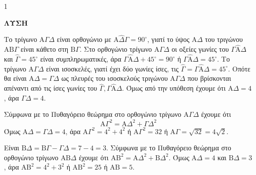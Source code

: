 \begin{ylh}{1}
    \item [Ύλη από εικόνα]
\end{ylh}
\textbf{ΛΥΣΗ}
\begin{alist}
    \item \begin{rlist}
        \item Το τρίγωνο $\text{A}\Gamma\Delta$ είναι ορθογώνιο με $\text{A}\hat{\Delta}\Gamma = 90^\circ$, γιατί το ύψος $\text{A}\Delta$ του τριγώνου $\text{AB}\Gamma$ είναι κάθετο στη $\text{B}\Gamma$. Στο ορθογώνιο τρίγωνο $\text{A}\Gamma\Delta$ οι οξείες γωνίες του $\Gamma\hat{\text{A}}\Delta$ και $\hat{\Gamma} = 45^\circ$ είναι συμπληρωματικές, άρα $\Gamma\hat{\text{A}}\Delta + 45^\circ = 90^\circ$ ή $\Gamma\hat{\text{A}}\Delta = 45^\circ$.
        Το τρίγωνο $\text{A}\Gamma\Delta$ είναι ισοσκελές, γιατί έχει δύο γωνίες ίσες, τις $\hat{\Gamma} = \Gamma\hat{\text{A}}\Delta = 45^\circ$. Οπότε θα είναι $\text{A}\Delta = \Gamma\Delta$ ως πλευρές του ισοσκελούς τριγώνου $\text{A}\Gamma\Delta$ που βρίσκονται απέναντι από τις ίσες γωνίες του $\hat{\Gamma}, \Gamma\hat{\text{A}}\Delta$. Όμως από την υπόθεση έχουμε ότι $\text{A}\Delta = 4$, άρα $\Gamma\Delta = 4$.
        \item Σύμφωνα με το Πυθαγόρειο θεώρημα στο ορθογώνιο τρίγωνο $\text{A}\Gamma\Delta$ έχουμε ότι
        \[ \text{A}\Gamma^2 = \text{A}\Delta^2 + \Gamma\Delta^2 \]
        Όμως $\text{A}\Delta = \Gamma\Delta = 4$, άρα $\text{A}\Gamma^2 = 4^2 + 4^2$ ή $\text{A}\Gamma^2 = 32$ ή $\text{A}\Gamma = \sqrt{32} = 4\sqrt{2}$.
    \end{rlist}
    \item Είναι $\text{B}\Delta = \text{B}\Gamma - \Gamma\Delta = 7 - 4 = 3$. Σύμφωνα με το Πυθαγόρειο θεώρημα στο ορθογώνιο τρίγωνο $\text{AB}\Delta$ έχουμε ότι $\text{AB}^2 = \text{A}\Delta^2 + \text{B}\Delta^2$.
    Όμως $\text{A}\Delta = 4$ και $\text{B}\Delta = 3$, άρα $\text{AB}^2 = 4^2 + 3^2$ ή $\text{AB}^2 = 25$ ή $\text{AB} = 5$.
\end{alist}